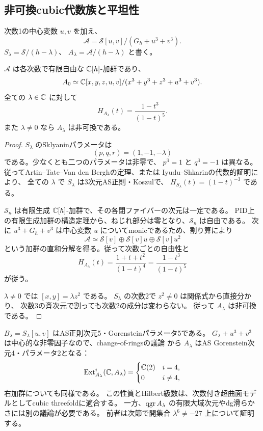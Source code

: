 \subsection{非可換cubic代数族と平坦性}

次数1の中心変数 $u,v$ を加え、
\begin{equation}\label{eq:family}
 \boxed{\quad
 \mathscr A=\mathscr S[u,v]/(G_h+u^3+v^3).
 \quad}
\end{equation}
$S_\lambda=\mathscr S/(h-\lambda)$、
$A_\lambda=\mathscr A/(h-\lambda)$ と書く。

\begin{theorem}[全パラメータで平坦な次数付き族]\label{thm:family}
$\mathscr A$ は各次数で有限自由な $\mathbb C[h]$-加群であり、
\[
 A_0\simeq
 \mathbb C[x,y,z,u,v]/(x^3+y^3+z^3+u^3+v^3).
\]
全ての $\lambda\in\mathbb C$ に対して
\[
 H_{A_\lambda}(t)=\frac{1-t^3}{(1-t)^5}.
\]
また $\lambda\ne0$ なら $A_\lambda$ は非可換である。
\end{theorem}

\begin{proof}
$S_\lambda$ のSklyaninパラメータは
\[
 (p,q,r)=(1,-1,-\lambda)
\]
である。少なくとも二つのパラメータは非零で、
$p^3=1$ と $q^3=-1$ は異なる。
従ってArtin--Tate--Van den Berghの定理、または
Iyudu--Shkarinの代数的証明\cite{IS}により、
全ての $\lambda$ で $S_\lambda$ は3次元AS正則・Koszulで、
$H_{S_\lambda}(t)=(1-t)^{-3}$ である。

$\mathscr S_n$ は有限生成 $\mathbb C[h]$-加群で、その各閉ファイバーの次元は一定である。
PID上の有限生成加群の構造定理から、ねじれ部分は零となり、$\mathscr S_n$ は自由である。
次に $u^3+G_h+v^3$ は中心変数 $u$ についてmonicであるため、割り算により
\[
 \mathscr A\simeq
 \mathscr S[v]\oplus\mathscr S[v]u\oplus\mathscr S[v]u^2
\]
という加群の直和分解を得る。従って次数ごとの自由性と
\[
 H_{A_\lambda}(t)
 =\frac{1+t+t^2}{(1-t)^4}
 =\frac{1-t^3}{(1-t)^5}
\]
が従う。

$\lambda\ne0$ では $[x,y]=\lambda z^2$ である。
$S_\lambda$ の次数2で $z^2\ne0$ は関係式から直接分かり、
次数3の斉次元で割っても次数2の成分は変わらない。
従って $A_\lambda$ は非可換である。
\end{proof}

$B_\lambda=S_\lambda[u,v]$ はAS正則次元5・Gorensteinパラメータ5である。
$G_\lambda+u^3+v^3$ は中心的な非零因子なので、change-of-ringsの議論
\cite[Lemma 1.2]{HeYe}から
$A_\lambda$ はAS Gorenstein次元4・パラメータ2となる：
\[
 \operatorname{Ext}^i_{A_\lambda}(\mathbb C,A_\lambda)=
 \begin{cases}
 \mathbb C(2)&i=4,\\
 0&i\ne4,
 \end{cases}
\]
右加群についても同様である。
この性質とHilbert級数は、次数付き超曲面モデルとしてcubic threefoldに適合する。
一方、$\operatorname{qgr} A_\lambda$ の有限大域次元やdg滑らかさには別の議論が必要である。
前者は次節で開集合 $\lambda^6\ne-27$ 上について証明する。


